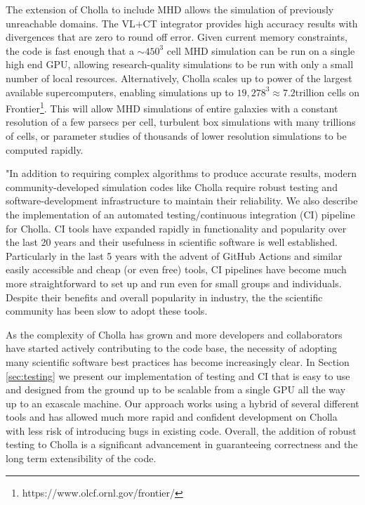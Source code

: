 The extension of Cholla to include MHD allows the simulation of previously unreachable domains. The VL+CT integrator provides high accuracy results with divergences that are zero to round off error. Given current memory constraints, the code is fast enough that a $\sim450^3$ cell MHD simulation can be run on a single high end GPU, allowing research-quality simulations to be run with only a small number of local resources. Alternatively, Cholla scales up to power of the largest available supercomputers, enabling simulations up to $19,278^3 \approx 7.2 \text{trillion}$ cells on Frontier\footnote{https://www.olcf.ornl.gov/frontier/}. This will allow MHD simulations of entire galaxies with a constant resolution of a few parsecs per cell, turbulent box simulations with many trillions of cells, or parameter studies of thousands of lower resolution simulations to be computed rapidly.

"In addition to requiring complex algorithms to produce accurate results, modern community-developed simulation codes like Cholla require robust testing and software-development infrastructure to maintain their reliability. We also describe the implementation of an automated testing/continuous integration (CI) pipeline for Cholla. CI tools have expanded rapidly in functionality and popularity over the last 20 years and their usefulness in scientific software is well established\citep{beck_1999, wilson_2014,wilson_2017}. Particularly in the last 5 years with the advent of GitHub Actions and similar easily accessible and cheap (or even free) tools, CI pipelines have become much more straightforward to set up and run even for small groups and individuals. Despite their benefits and overall popularity in industry, the the scientific community has been slow to adopt these tools.

As the complexity of Cholla has grown and more developers and collaborators have started actively contributing to the code base, the necessity of adopting many scientific software best practices has become increasingly clear. In Section \ref{sec:testing} we present our implementation of testing and CI that is easy to use and designed from the ground up to be scalable from a single GPU all the way up to an exascale machine. Our approach works using a hybrid of several different tools and has allowed much more rapid and confident development on Cholla with less risk of introducing bugs in existing code. Overall, the addition of robust testing to Cholla is a significant advancement in guaranteeing correctness and the long term extensibility of the code.

